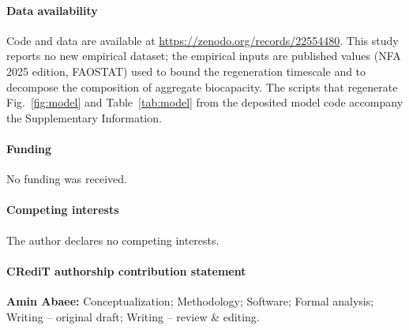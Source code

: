 \documentclass[preprint,12pt,authoryear]{elsarticle}
\begin{document}
\paragraph{Data availability} Code and data are available at \url{https://zenodo.org/records/22554480}. This study reports no new empirical dataset; the empirical inputs are published values (NFA 2025 edition, FAOSTAT) used to bound the regeneration timescale and to decompose the composition of aggregate biocapacity. The scripts that regenerate Fig.~\ref{fig:model} and Table~\ref{tab:model} from the deposited model code accompany the Supplementary Information.

\paragraph{Funding} No funding was received.

\paragraph{Competing interests} The author declares no competing interests.

\paragraph{CRediT authorship contribution statement} \textbf{Amin Abaee:} Conceptualization; Methodology; Software; Formal analysis; Writing -- original draft; Writing -- review \& editing.
\end{document}
